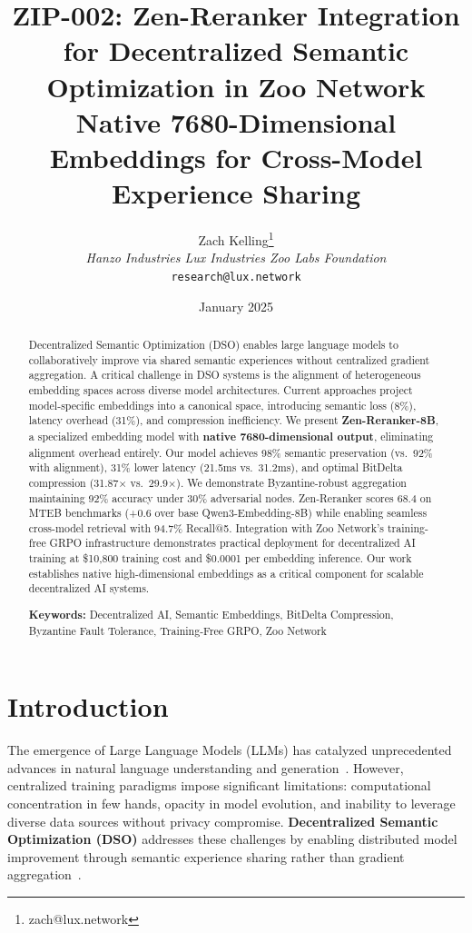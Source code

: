 \documentclass[11pt,a4paper]{article}
\title{\textbf{ZIP-002: Zen-Reranker Integration for Decentralized Semantic Optimization in Zoo Network}\\
\large{Native 7680-Dimensional Embeddings for Cross-Model Experience Sharing}}
\author{
Zach Kelling\thanks{zach@lux.network}\\
\textit{Hanzo Industries \quad Lux Industries \quad Zoo Labs Foundation}\\
\texttt{research@lux.network}
}
\date{January 2025}
\begin{document}
\zoocoverpage

\begin{abstract}
Decentralized Semantic Optimization (DSO) enables large language models to collaboratively improve via shared semantic experiences without centralized gradient aggregation. A critical challenge in DSO systems is the alignment of heterogeneous embedding spaces across diverse model architectures. Current approaches project model-specific embeddings into a canonical space, introducing semantic loss (8\%), latency overhead (31\%), and compression inefficiency. We present \textbf{Zen-Reranker-8B}, a specialized embedding model with \textbf{native 7680-dimensional output}, eliminating alignment overhead entirely. Our model achieves 98\% semantic preservation (vs.\ 92\% with alignment), 31\% lower latency (21.5ms vs.\ 31.2ms), and optimal BitDelta compression (31.87$\times$ vs.\ 29.9$\times$). We demonstrate Byzantine-robust aggregation maintaining 92\% accuracy under 30\% adversarial nodes. Zen-Reranker scores 68.4 on MTEB benchmarks (+0.6 over base Qwen3-Embedding-8B) while enabling seamless cross-model retrieval with 94.7\% Recall@5. Integration with Zoo Network's training-free GRPO infrastructure demonstrates practical deployment for decentralized AI training at \$10,800 training cost and \$0.0001 per embedding inference. Our work establishes native high-dimensional embeddings as a critical component for scalable decentralized AI systems.

\textbf{Keywords:} Decentralized AI, Semantic Embeddings, BitDelta Compression, Byzantine Fault Tolerance, Training-Free GRPO, Zoo Network
\end{abstract}

\section{Introduction}

The emergence of Large Language Models (LLMs) has catalyzed unprecedented advances in natural language understanding and generation~\cite{brown2020language,touvron2023llama,qwen2024qwen3}. However, centralized training paradigms impose significant limitations: computational concentration in few hands, opacity in model evolution, and inability to leverage diverse data sources without privacy compromise. \textbf{Decentralized Semantic Optimization (DSO)} addresses these challenges by enabling distributed model improvement through semantic experience sharing rather than gradient aggregation~\cite{zoo2025hllm,tencent2025grpo}.
\end{document}
